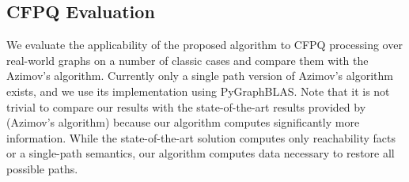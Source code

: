 
\subsection{CFPQ Evaluation}

We evaluate the applicability of the proposed algorithm to CFPQ processing over real-world graphs on a number of classic cases and compare them with the Azimov's algorithm.
Currently only a single path version of Azimov's algorithm exists, and we use its implementation using PyGraphBLAS. Note that it is not trivial to compare our results with the state-of-the-art results provided by~\cite{10.1145/3398682.3399163} (Azimov's algorithm) because our algorithm computes significantly more information. While the state-of-the-art solution computes only reachability facts or a single-path semantics, our algorithm computes data necessary to restore all possible paths.

